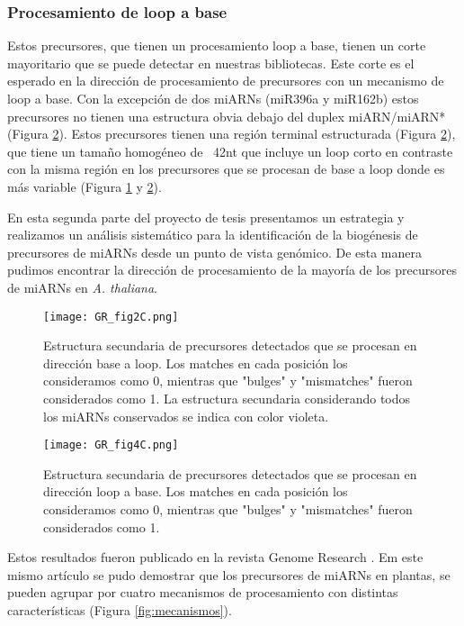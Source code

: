 \subsubsection{Procesamiento de loop a base}
Estos precursores, que tienen un procesamiento loop a base, tienen un corte mayoritario que se puede detectar en nuestras bibliotecas.
Este corte es el esperado en la dirección de procesamiento de precursores con un mecanismo de loop a base.
Con la excepción de dos miARNs (miR396a y miR162b) estos precursores no tienen una estructura obvia debajo del duplex miARN/miARN* (Figura \ref{fig:GR_fig4C}).
Estos precursores tienen una región terminal estructurada (Figura \ref{fig:GR_fig4C}), que tiene un tamaño homogéneo de ~42nt que incluye un loop corto en contraste con la misma región en los precursores que se procesan de base a loop donde es más variable (Figura \ref{fig:GR_fig2C} y \ref{fig:GR_fig4C}). 

En esta segunda parte del proyecto de tesis presentamos un estrategia y realizamos un análisis sistemático para la identificación de la biogénesis de precursores de miARNs desde un punto de vista genómico.
De esta manera pudimos encontrar la dirección de procesamiento de la mayoría de los precursores de miARNs en \textit{A. thaliana}.

\begin{figure}[htbp!] 
    \centering    
    \texttt{[image: GR\_fig2C.png]}
    \caption[Estructura secundaria de precursores de base a loop]{Estructura secundaria de precursores detectados que se procesan en dirección base a loop.
    Los matches en cada posición los consideramos como 0, mientras que "bulges" y "mismatches" fueron considerados como 1.
    La estructura secundaria considerando todos los miARNs conservados se indica con color violeta.
    }
    \label{fig:GR_fig2C}
\end{figure}

\begin{figure}[htbp!] 
    \centering    
    \texttt{[image: GR\_fig4C.png]}
    \caption[Estructura secundaria de precursores de loop a base]{
    Estructura secundaria de precursores detectados que se procesan en dirección loop a base.
    Los matches en cada posición los consideramos como 0, mientras que "bulges" y "mismatches" fueron considerados como 1.}
    \label{fig:GR_fig4C}
\end{figure}


Estos resultados fueron publicado en la revista Genome Research \citep{Bologna2013}.
Em este mismo artículo se pudo demostrar que los precursores de miARNs en plantas, se pueden agrupar por cuatro mecanismos de procesamiento con distintas características (Figura \ref{fig:mecanismos}).

